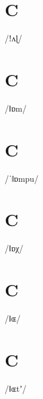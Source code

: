 \documentclass[10pt,a4paper,twoside]{book}
\begin{document}
\section*{C}

\begin{multicols}{3}
 {/ǃʌɭ/} {}
\end{multicols}

\section*{C}

\begin{multicols}{3}
 {/ǁɒm/} {}
\end{multicols}

\section*{C}

\begin{multicols}{3}
 {/ˈǁɒmpu/} {}
\end{multicols}

\section*{C}

\begin{multicols}{3}
 {/ǁɒχ/} {}
\end{multicols}

\section*{C}

\begin{multicols}{3}
 {/ǁɶ/} {}
\end{multicols}

\section*{C}

\begin{multicols}{3}
 {/ǁɶtʼ/} {}
\end{multicols}
\end{document}
